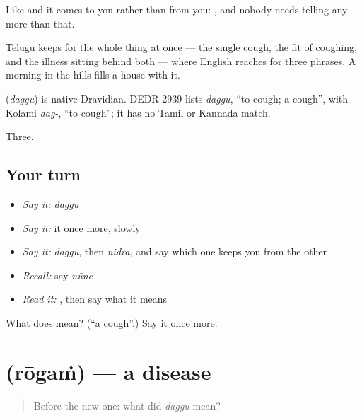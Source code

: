 Like  and  it comes to you rather than from you:  , and nobody needs telling any more than that.

Telugu keeps  for the whole thing at once — the single cough, the fit of coughing, and the illness sitting behind both — where English reaches for three phrases. A  morning in the hills fills a house with it.

\begin{cousinweb}
\textbf{} (\emph{daggu}) is native Dravidian. DEDR 2939 lists \emph{daggu}, \textquotedblleft{}to cough; a cough\textquotedblright{}, with Kolami \emph{dag-}, \textquotedblleft{}to cough\textquotedblright{}; it has no Tamil or Kannada match.
\end{cousinweb}

\begin{grammarlens}[title={What you've built}]
Three.
\end{grammarlens}

\subsection*{Your turn}
\begin{itemize}
\raggedright
  \item \emph{Say it:} \emph{daggu}
  \item \emph{Say it:} it once more, slowly
  \item \emph{Say it:} \emph{daggu}, then \emph{nidra}, and say which one keeps you from the other
  \item \emph{Recall:} say \emph{nūne}
  \item \emph{Read it:} \textbf{}, then say what it means
\end{itemize}

\begin{tcolorbox}[breakable,colback=teal!4,colframe=teal!35!black,title={Before you move on}]
What does  mean? (\textquotedblleft{}a cough\textquotedblright{}.) Say it once more.
\end{tcolorbox}
\section[\texorpdfstring{\te{రోగం} (rōgaṁ)}{రోగం (rōgaṁ)}]{ (rōgaṁ) — a disease}

\label{lesson:TE-C63-disease}



\begin{quote}
Before the new one: what did \emph{daggu} mean?
\end{quote}

